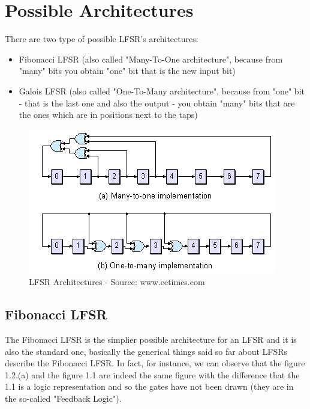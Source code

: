 \documentclass[a4paper]{report}
\begin{document}
\section{Possible Architectures}
There are two type of possible LFSR's architectures:
\begin{itemize}
	\item Fibonacci LFSR (also called "Many-To-One architecture", because from "many" bits you obtain "one" bit that is the new input bit)
	\item Galois LFSR (also called "One-To-Many architecture", because from "one" bit - that is the last one and also the output - you obtain "many" bits that are the ones which are in positions next to the taps)
\end{itemize}
\begin{figure}[htpb]
	\centering
	\includegraphics[scale=0.9]{img/architectures.png}
	\caption{LFSR Architectures - Source: www.eetimes.com}
\end{figure}
\subsection{Fibonacci LFSR}
The Fibonacci LFSR is the simplier possible architecture for an LFSR  and it is also the standard one, basically the generical things said so far about LFSRs describe the Fibonacci LFSR. In fact, for instance, we can observe that the figure 1.2.(a) and the figure 1.1 are indeed the same figure with the difference that the 1.1 is a logic representation and so the gates have not been drawn (they are in the so-called "Feedback Logic").
\end{document}
